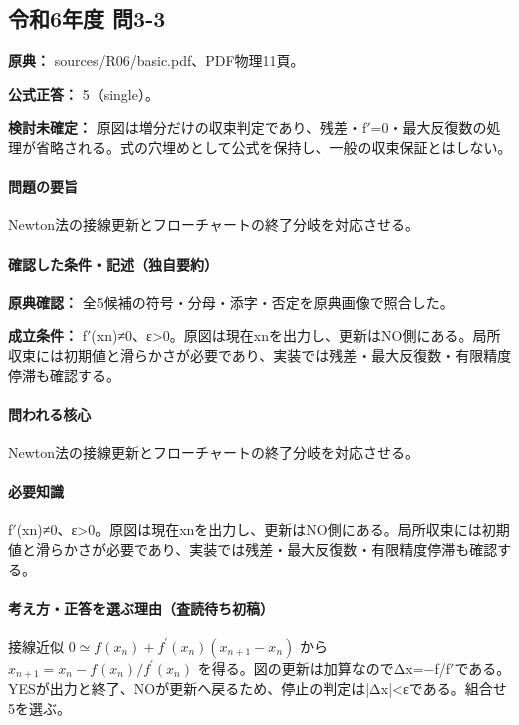 \subsection{令和6年度 問3-3}
\label{q:r06-reg-basic-3-3}

\noindent\textbf{原典：} sources/R06/basic.pdf、PDF物理11頁。

\textbf{公式正答：} 5（single）。

\par\textbf{検討未確定：} 原図は増分だけの収束判定であり、残差・f\ensuremath{'}=0・最大反復数の処理が省略される。式の穴埋めとして公式を保持し、一般の収束保証とはしない。

\paragraph{問題の要旨} Newton法の接線更新とフローチャートの終了分岐を対応させる。

\paragraph{確認した条件・記述（独自要約）}\mbox{}\par

\noindent\textbf{原典確認：} 全5候補の符号・分母・添字・否定を原典画像で照合した。\par

\noindent\textbf{成立条件：} f\ensuremath{'}(xn)≠0、ε>0。原図は現在xnを出力し、更新はNO側にある。局所収束には初期値と滑らかさが必要であり、実装では残差・最大反復数・有限精度停滞も確認する。\par

\paragraph{問われる核心} Newton法の接線更新とフローチャートの終了分岐を対応させる。

\paragraph{必要知識} f\ensuremath{'}(xn)≠0、ε>0。原図は現在xnを出力し、更新はNO側にある。局所収束には初期値と滑らかさが必要であり、実装では残差・最大反復数・有限精度停滞も確認する。

\paragraph{考え方・正答を選ぶ理由（査読待ち初稿）} 接線近似 \(0\simeq f(x_n)+f^\prime(x_n)(x_{n+1}-x_n)\) から \(x_{n+1}=x_n-f(x_n)/f^\prime(x_n)\) を得る。図の更新は加算なのでΔx=−f/f\ensuremath{'}である。YESが出力と終了、NOが更新へ戻るため、停止の判定は|Δx|<εである。組合せ5を選ぶ。

